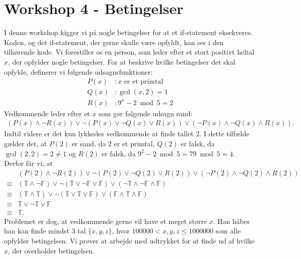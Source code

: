 \section{Workshop 4 - Betingelser}
I denne workshop kigger vi på nogle betingelser for at et if-statement eksekveres. Koden, og det if-statement, der gerne skulle være opfyldt, kan ses i den tilhørende kode. Vi forestiller os en person, som leder efter et stort positivt heltal $x$, der opfylder nogle betingelser. For at beskrive hvilke betingelser det skal opfylde, definerer vi følgende udsagnsfunktioner:
\begin{align*}
	P(x)&: x \text{ er et primtal}\\
	Q(x)&: \gcd(x,2)=1\\
	R(x)&: 9^x-2\bmod{5} = 2
\end{align*}
Vedkommende leder efter et $x$ som gør følgende udsagn sand:
\begin{align}\label{eq:Betingelse}
	(P(x)\wedge \neg R(x)) \vee \neg(P(x)\vee \neg Q(x) \vee R(x)) \vee (\neg P(x) \wedge \neg Q(x) \wedge R(x)).
\end{align}
Indtil videre er det kun lykkedes vedkommende at finde tallet $2$. I dette tilfælde gælder det, at $P(2)$ er sand, da $2$ er et primtal, $Q(2)$ er falsk, da $\gcd(2,2)=2\neq 1$ og $R(2)$ er falsk, da $9^2-2 \bmod 5=79 \bmod 5=4$. Derfor får vi, at
\begin{align*}
	&(P(2)\wedge \neg R(2)) \vee \neg(P(2)\vee \neg Q(2) \vee R(2)) \vee (\neg P(2) \wedge \neg Q(2) \wedge R(2))\\
	\equiv& (\mathbb{T}\wedge \neg \mathbb{F}) \vee \neg(\mathbb{T}\vee \neg \mathbb{F} \vee \mathbb{F}) \vee (\neg \mathbb{T} \wedge \neg \mathbb{F} \wedge \mathbb{F})\\
	\equiv& (\mathbb{T}\wedge \mathbb{T}) \vee \neg(\mathbb{T}\vee  \mathbb{T} \vee \mathbb{F}) \vee (\mathbb{F} \wedge  \mathbb{T} \wedge \mathbb{F})\\
	\equiv& \mathbb{T} \vee \neg\mathbb{T} \vee \mathbb{F} \\
	\equiv& \mathbb{T}.
\end{align*}
Problemet er dog, at vedkommende gerne vil have et meget større $x$. Han håber han kan finde mindst $3$ tal $\{x,y,z\}$, hvor $100000<x,y,z\leq 1000000$ som alle opfylder betingelsen.
Vi prøver at arbejde med udtrykket for at finde ud af hvilke $x$, der overholder betingelsen.
